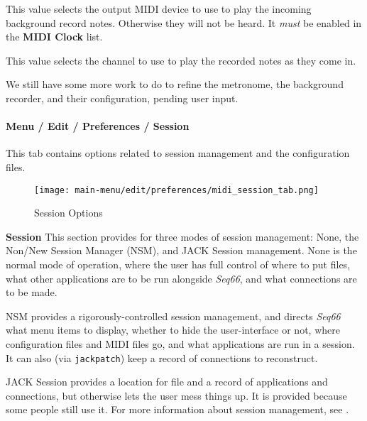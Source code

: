    This value selects the output MIDI device to use to play the incoming
   background record notes.  Otherwise they will not be heard.
   It \textsl{must} be enabled in the \textbf{MIDI Clock} list.

   This value selects the channel to use to play the recorded notes as
   they come in.

   We still have some more work to do to refine the metronome, the
   background recorder, and their configuration, pending user input.

\paragraph{Menu / Edit / Preferences / Session}
\label{paragraph:menu_edit_preferences_session}

   This tab contains options related to session management and the
   configuration files.

\begin{figure}[H]
   \centering 
   \texttt{[image: main-menu/edit/preferences/midi\_session\_tab.png]}
   \caption{Session Options}
   \label{fig:midi_session_options_tab}
\end{figure}

   \setcounter{ItemCounter}{0}      %

   \textbf{Session}
   This section provides for three modes of session management:  None, the
   Non/New Session Manager (NSM), and JACK Session management.
   None is the normal mode of operation, where the user has full control of
   where to put files, what other applications are to be run alongside
   \textsl{Seq66}, and what connections are to be made.

   NSM provides a rigorously-controlled session management, and directs
   \textsl{Seq66} what menu items to display, whether to hide the
   user-interface or not, where configuration files and MIDI files go, and what
   applications are run in a session. It can also (via \texttt{jackpatch}) keep
   a record of connections to reconstruct.

   JACK Session provides a location for file and a record of applications and
   connections, but otherwise lets the user mess things up.  It is
   provided because some people still use it.
   For more information about session management, see
   .

